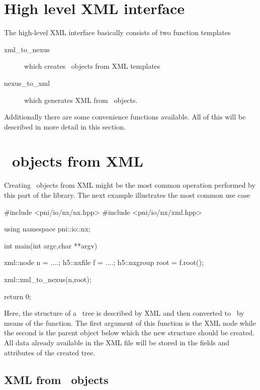 {%
\section{High level XML interface}\label{sec:xml:highlevel}

The high-level XML interface basically consists of two function templates 
\begin{description}
\item[xml\_to\_nexus] which creates \nexus\ objects from XML templates
\item[nexus\_to\_xml] which generates XML from \nexus\ objects.
\end{description}
Additionally there are some convenience functions available. All of this will be
described in more detail in this section.

\section{\nexus\ objects from XML}\label{sec:xml::nxtoxml}

Creating \nexus\ objects from XML might be the most common operation performed 
by this part of the library. The next example illustrates the most common 
use case 
\begin{cppcode}
#include <pni/io/nx/nx.hpp>
#include <pni/io/nx/xml.hpp>

using namespace pni::io::nx;

int main(int argc,char **argv)
{
    xml::node n = ....;
    h5::nxfile f = ....;
    h5::nxgroup root = f.root();
    
    xml::xml_to_nexus(n,root);

    return 0;
}
\end{cppcode}
Here, the structure of a \nexus\ tree is described by XML and then converted 
to \nexus\ by means of the  function. The first argument 
of this function is the XML node while the second is the parent object 
below which the new structure should be created. All data already available 
in the XML file will be stored in the fields and attributes of the created
\nexus\-tree. 


\subsection{XML from \nexus\ objects}\label{sec:xml:xmltonx}

}
